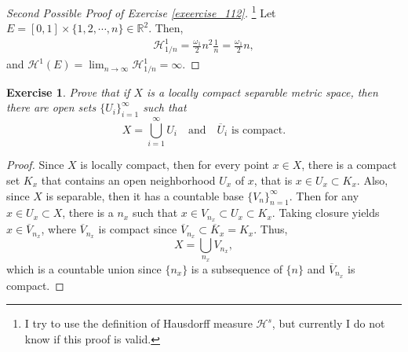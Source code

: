 \documentclass[11pt]{book}
\newtheorem{exercise}{Exercise}[section]
\theoremstyle{definition}
\numberwithin{equation}{chapter}
\begin{document}
\begin{proof}[Second Possible Proof of Exercise \ref{exeercise_112}]\footnote{I try to use the definition of Hausdorff measure $\mathcal{H}^s$, but currently I do not know if this proof is valid.} Let $E = [0,1] \times \{1,2,\cdots, n\} \in \mathbb{R}^2$. Then,
\begin{align*}
    \mathcal{H}^1_{1/n} = \frac{\omega_1}{2} n^2 \frac{1}{n} = \frac{\omega_1}{2} n,
\end{align*}
and $\mathcal{H}^1(E) = \lim_{n\to\infty} \mathcal{H}^1_{1/n} = \infty$.
\end{proof}

\medskip

\begin{exercise}
Prove that if $X$ is a locally compact separable metric space, then there are open sets $\{U_i\}_{i=1}^\infty$ such that
$$
X=\bigcup_{i=1}^\infty U_i
\quad
\text{and}
\quad
\text{$\overline{U}_i$ is compact.}
$$
\end{exercise}
\begin{proof}
Since $X$ is locally compact, then for every point $x \in X$, there is a compact set $K_x$ that contains an open neighborhood $U_x$ of $x$, that is $x \in U_x \subset K_x$. Also, since $X$ is separable, then it has a countable base $\{V_n \}^\infty_{n=1}$. Then for any $x \in U_x \subset X$, there is a $n_x$ such that $x \in V_{n_x} \subset U_x \subset K_x$. Taking closure yields $x \in \overline{V}_{n_x}$, where $\overline{V}_{n_x}$ is compact since $\overline{V}_{n_x} \subset \overline{K}_x = K_x$. Thus, $$X = \bigcup_{n_x} V_{n_x},$$ which is a countable union since $\{n_x\}$ is a subsequence of $\{n\}$ and $\overline{V}_{n_x}$ is compact.
\end{proof}

\medskip
\end{document}
